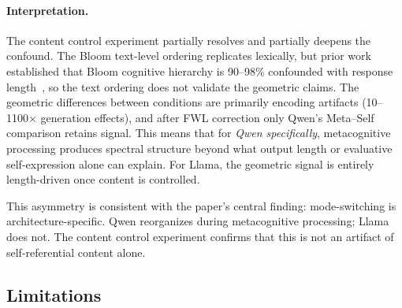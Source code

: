 \documentclass[11pt,a4paper]{article}
\begin{document}
\paragraph{Interpretation.}
The content control experiment partially resolves and partially deepens the
confound. The Bloom text-level ordering replicates lexically, but prior work
established that Bloom cognitive hierarchy is 90--98\% confounded with
response length~\citep{lyra2026campaign3}, so the text ordering does not
validate the geometric claims. The geometric differences between conditions
are primarily encoding artifacts (10--1100$\times$ generation effects), and
after FWL correction only Qwen's Meta--Self comparison retains signal. This
means that for \emph{Qwen specifically}, metacognitive processing produces
spectral structure beyond what output length or evaluative self-expression
alone can explain. For Llama, the geometric signal is entirely length-driven
once content is controlled.

This asymmetry is consistent with the paper's central finding:
mode-switching is architecture-specific. Qwen reorganizes during metacognitive
processing; Llama does not. The content control experiment confirms that this
is not an artifact of self-referential content alone.

\subsection{Limitations}
\end{document}
